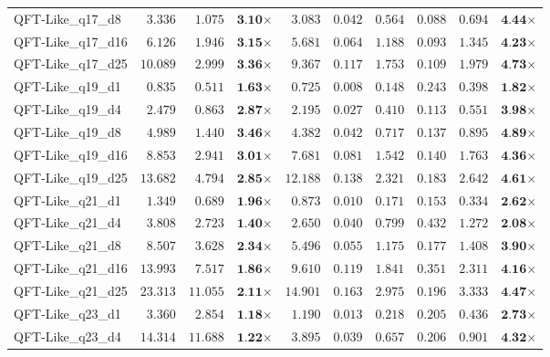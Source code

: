 \begin{table*}[t]
{\begin{tabular}{| l || r r c || r r r r r c |}
QFT-Like\_q17\_d8 & $3.336$ & $1.075$ & $\textbf{3.10}$$\times$ & $3.083$ & $0.042$ & $0.564$ & $0.088$ & $0.694$ & $\textbf{4.44}$$\times$ \\
QFT-Like\_q17\_d16 & $6.126$ & $1.946$ & $\textbf{3.15}$$\times$ & $5.681$ & $0.064$ & $1.188$ & $0.093$ & $1.345$ & $\textbf{4.23}$$\times$ \\
QFT-Like\_q17\_d25 & $10.089$ & $2.999$ & $\textbf{3.36}$$\times$ & $9.367$ & $0.117$ & $1.753$ & $0.109$ & $1.979$ & $\textbf{4.73}$$\times$ \\
QFT-Like\_q19\_d1 & $0.835$ & $0.511$ & $\textbf{1.63}$$\times$ & $0.725$ & $0.008$ & $0.148$ & $0.243$ & $0.398$ & $\textbf{1.82}$$\times$ \\
QFT-Like\_q19\_d4 & $2.479$ & $0.863$ & $\textbf{2.87}$$\times$ & $2.195$ & $0.027$ & $0.410$ & $0.113$ & $0.551$ & $\textbf{3.98}$$\times$ \\
QFT-Like\_q19\_d8 & $4.989$ & $1.440$ & $\textbf{3.46}$$\times$ & $4.382$ & $0.042$ & $0.717$ & $0.137$ & $0.895$ & $\textbf{4.89}$$\times$ \\
QFT-Like\_q19\_d16 & $8.853$ & $2.941$ & $\textbf{3.01}$$\times$ & $7.681$ & $0.081$ & $1.542$ & $0.140$ & $1.763$ & $\textbf{4.36}$$\times$ \\
QFT-Like\_q19\_d25 & $13.682$ & $4.794$ & $\textbf{2.85}$$\times$ & $12.188$ & $0.138$ & $2.321$ & $0.183$ & $2.642$ & $\textbf{4.61}$$\times$ \\
QFT-Like\_q21\_d1 & $1.349$ & $0.689$ & $\textbf{1.96}$$\times$ & $0.873$ & $0.010$ & $0.171$ & $0.153$ & $0.334$ & $\textbf{2.62}$$\times$ \\
QFT-Like\_q21\_d4 & $3.808$ & $2.723$ & $\textbf{1.40}$$\times$ & $2.650$ & $0.040$ & $0.799$ & $0.432$ & $1.272$ & $\textbf{2.08}$$\times$ \\
QFT-Like\_q21\_d8 & $8.507$ & $3.628$ & $\textbf{2.34}$$\times$ & $5.496$ & $0.055$ & $1.175$ & $0.177$ & $1.408$ & $\textbf{3.90}$$\times$ \\
QFT-Like\_q21\_d16 & $13.993$ & $7.517$ & $\textbf{1.86}$$\times$ & $9.610$ & $0.119$ & $1.841$ & $0.351$ & $2.311$ & $\textbf{4.16}$$\times$ \\
QFT-Like\_q21\_d25 & $23.313$ & $11.055$ & $\textbf{2.11}$$\times$ & $14.901$ & $0.163$ & $2.975$ & $0.196$ & $3.333$ & $\textbf{4.47}$$\times$ \\
QFT-Like\_q23\_d1 & $3.360$ & $2.854$ & $\textbf{1.18}$$\times$ & $1.190$ & $0.013$ & $0.218$ & $0.205$ & $0.436$ & $\textbf{2.73}$$\times$ \\
QFT-Like\_q23\_d4 & $14.314$ & $11.688$ & $\textbf{1.22}$$\times$ & $3.895$ & $0.039$ & $0.657$ & $0.206$ & $0.901$ & $\textbf{4.32}$$\times$ \\

\end{tabular}}
\end{table*}
